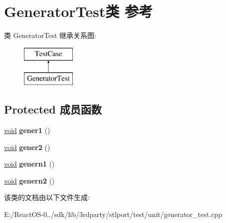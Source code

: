 \hypertarget{class_generator_test}{}\section{Generator\+Test类 参考}
\label{class_generator_test}
类 Generator\+Test 继承关系图\+:\begin{figure}[H]
\begin{center}
\leavevmode
\includegraphics[height=2.000000cm]{class_generator_test}
\end{center}
\end{figure}
\subsection*{Protected 成员函数}
\begin{DoxyCompactItemize}
\item 
\mbox{\label{class_generator_test_a21c9b7616283132b2ec4bd77d3c5e01f}} 
\hyperlink{interfacevoid}{void} {\bfseries gener1} ()
\item 
\mbox{\label{class_generator_test_a5c2463e3d588e66f0f6c79f052ea9254}} 
\hyperlink{interfacevoid}{void} {\bfseries gener2} ()
\item 
\mbox{\label{class_generator_test_a71095bc0b4f984d29a8239279c41dc8c}} 
\hyperlink{interfacevoid}{void} {\bfseries genern1} ()
\item 
\mbox{\label{class_generator_test_a9c28602a6d8f1c845f8b6a3efb628fff}} 
\hyperlink{interfacevoid}{void} {\bfseries genern2} ()
\end{DoxyCompactItemize}


该类的文档由以下文件生成\+:\begin{DoxyCompactItemize}
\item 
E\+:/\+React\+O\+S-\/0../sdk/lib/3rdparty/stlport/test/unit/generator\+\_\+test.\+cpp\end{DoxyCompactItemize}
